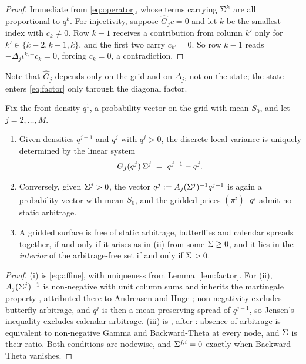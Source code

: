\begin{proof}
Immediate from \eqref{eq:operator}, whose terms carrying $\Sigma^k$ are all
proportional to $q^k$. For injectivity, suppose $\widehat G_jc=0$ and let $k$ be
the smallest index with $c_k\neq0$. Row $k-1$ receives a contribution from column
$k'$ only for $k'\in\{k-2,k-1,k\}$, and the first two carry $c_{k'}=0$. So row
$k-1$ reads $-\Delta_j\iota^{k,-}c_k=0$, forcing $c_k=0$, a contradiction.
\end{proof}

Note that $\widehat G_j$ depends only on the grid and on $\Delta_j$, not on the
state; the state enters \eqref{eq:factor} only through the diagonal factor.

\begin{proposition}\label{prop:codebook}
Fix the front density $q^{1}$, a probability vector on the grid with mean $S_0$, and let $j=2,\dots,M$.
\begin{enumerate}[label=(\roman*),leftmargin=2em]
\item Given densities $q^{j-1}$ and $q^{j}$ with $q^j>0$, the discrete local
variance is uniquely determined by the linear system
\begin{equation}\label{eq:bijection}
  G_j(q^j)\,\Sigma^j\;=\;q^{j-1}-q^{j}.
\end{equation}
\item Conversely, given $\Sigma^j>0$, the vector $q^j:=A_j(\Sigma^j)^{-1}q^{j-1}$
is again a probability vector with mean $S_0$, and the gridded prices
$(\pi^i)^{\!\top}q^j$ admit no static arbitrage.
\item A gridded surface is free of static arbitrage, butterflies and
calendar spreads together, if and only if it arises as in \textup{(ii)} from
some $\Sigma\ge0$, and it lies in the \emph{interior} of the arbitrage-free set
if and only if $\Sigma>0$.
\end{enumerate}
\end{proposition}

\begin{proof}
(i) is \eqref{eq:affine}, with uniqueness from Lemma~\ref{lem:factor}. For (ii),
$A_j(\Sigma^j)^{-1}$ is non-negative with unit column sums and inherits the
martingale property \cite{BuehlerRyskin2016}, attributed there
to Andreasen and Huge \cite{AndreasenHuge2011}; non-negativity excludes butterfly
arbitrage, and $q^j$ is then a mean-preserving spread of $q^{j-1}$, so Jensen's
inequality excludes calendar arbitrage. (iii) is \cite{BuehlerRyskin2016}, after
\cite{Buehler2006}: absence of arbitrage
is equivalent to non-negative Gamma and Backward-Theta at every node, and $\Sigma$
is their ratio. Both conditions are
nodewise, and $\Sigma^{j,i}=0$ exactly when Backward-Theta vanishes.
\end{proof}

